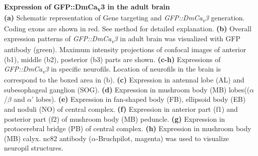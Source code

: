\label{fig:2} 
\textbf{Expression of GFP::DmCa\textsubscript{v}3 in the adult brain} 
\\ 
\textbf{(a)} Schematic representation of Gene targeting and \emph{GFP::DmCa\textsubscript{v}3} generation. 
Coding exons are shown in red. 
See method for detailed explanation.
\textbf{(b)} Overall expression patterns of \emph{GFP::DmCa\textsubscript{v}3} in adult brain was visualized with GFP antibody (green). 
Maximum intensity projections of confocal images of anterior (b1), middle (b2), posterior (b3) parts are shown.
\textbf{(c-h)} Expressions of \emph{GFP::DmCa\textsubscript{v}3} in specific neurofils. Location of neurofils in the brain is correspond to the boxed area in (b).
\textbf{(c)} Expression in antennal lobe (AL) and subesophageal ganglion (SOG).
\textbf{(d)} Expression in mushroom body (MB) lobes(($\alpha$/$\beta$ and $\alpha$\textquoteright{} lobes). 
\textbf{(e)} Expression in fan-shaped body (FB), ellipsoid body (EB) and noduli (NO) of central complex.
\textbf{(f)} Expression in anterior part (f1) and posterior part (f2) of mushroom body (MB) peduncle.
\textbf{(g)} Expression in protocerebral bridge (PB) of central complex. 
\textbf{(h)} Expression in mushroom body (MB) calyx. 
nc82  antibody ($\alpha$-Bruchpilot, magenta) was used to visualize neuropil structures. 

  
  
  
  